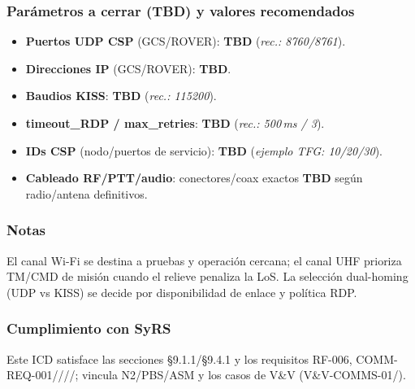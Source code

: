 \subsubsection{Parámetros a cerrar (TBD) y valores recomendados}
\begin{itemize}
  \item \textbf{Puertos UDP CSP} (GCS/ROVER): \textbf{TBD} (\emph{rec.: 8760/8761}).
  \item \textbf{Direcciones IP} (GCS/ROVER): \textbf{TBD}.
  \item \textbf{Baudios KISS}: \textbf{TBD} (\emph{rec.: 115200}).
  \item \textbf{timeout\_RDP / max\_retries}: \textbf{TBD} (\emph{rec.: 500\,ms / 3}).
  \item \textbf{IDs CSP} (nodo/puertos de servicio): \textbf{TBD} (\emph{ejemplo TFG: 10/20/30}).
  \item \textbf{Cableado RF/PTT/audio}: conectores/coax exactos \textbf{TBD} según radio/antena definitivos.
\end{itemize}

\subsubsection{Notas}
El canal Wi-Fi se destina a pruebas y operación cercana; el canal UHF prioriza TM/CMD de misión cuando
el relieve penaliza la LoS. La selección dual-homing (UDP vs KISS) se decide por disponibilidad de enlace
y política RDP.%

\subsubsection{Cumplimiento con SyRS}
Este ICD satisface las secciones §9.1.1/\allowbreak §9.4.1 y los requisitos RF-006, COMM-REQ-001////;
vincula N2/\allowbreak PBS/\allowbreak ASM y los casos de V\&V (V\&V-COMMS-01/).%
